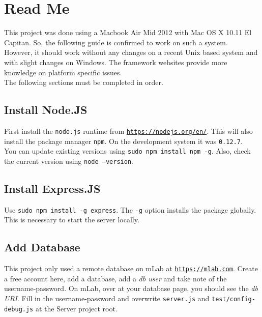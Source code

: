 \chapter{Read Me}

This project was done using a Macbook Air Mid 2012 with Mac OS X 10.11 El Capitan. So, the following guide is confirmed to work on such a system.\\

However, it should work without any changes on a recent Unix based system and with slight changes on Windows. The framework websites provide more knowledge on platform specific issues.\\

The following sections must be completed in order.

\section{Install Node.JS}

First install the \texttt{node.js} runtime from \texttt{\hyperref[https://nodejs.org/en/]{https://nodejs.org/en/}}. This will also install the package manager \texttt{npm}. On the development system it was \texttt{0.12.7}.\\

You can update existing versions using \texttt{sudo npm install npm -g}. Also, check the current version using \texttt{node --version}.

\section{Install Express.JS}

Use \texttt{sudo npm install -g express}. The \texttt{-g} option installs the package globally. This is necessary to start the server locally.

\section{Add Database}

This project only used a remote database on mLab at \texttt{\hyperref[https://mlab.com]{https://mlab.com}}. Create a free account here, add a database, add a \textit{db user} and take note of the username-password. On mLab, over at your database page, you should see the \textit{db URI}. Fill in the username-password and overwrite \texttt{server.js} and \texttt{test/config-debug.js} at the Server project root.

